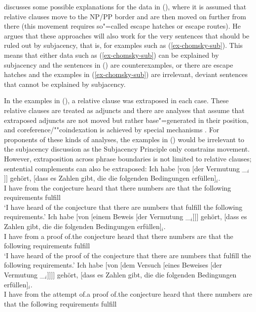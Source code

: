 \citet[--54]{Koster78b-u} discusses some possible explanations for the data in (), where it is assumed that relative clauses move to the NP/PP border and are then
moved on further from there (this movement requires so"=called escape hatches or escape routes). He argues that
these approaches will also work for the very sentences that should be ruled out by subjacency, that is, for examples such as (\ref{ex-chomsky-sub}). This means that either
data such as (\ref{ex-chomsky-sub}) can be explained by subjacency and the sentences in ()  are counterexamples, or there are escape hatches and the examples in
(\ref{ex-chomsky-sub}) are irrelevant, deviant sentences that cannot be explained by subjacency.

In the examples in (), a relative clause was extraposed in each case. These relative clauses
are treated as adjuncts and there are analyses that assume that extraposed adjuncts are not moved but rather base"=generated in their position,
and coreference/""coindexation is achieved by special mechanisms \citep{Kiss2005a}.
For proponents of these kinds of analyses, the examples in () would be irrelevant to the subjacency discussion as the Subjacency Principle
only constrains movement. However, extraposition across phrase boundaries is not limited to relative clauses; sentential complements can also be extraposed:
\eal
\ex 
\gll Ich habe [von [der Vermutung \_$_i$]] gehört, [dass es Zahlen gibt, die die folgenden Bedingungen erfüllen]$_i$.\\
	 I have \spacebr{}from \spacebr{}the conjecture {} heard \spacebr{}that there numbers are that the following requirements fulfill\\
\glt `I have heard of the conjecture that there are numbers that fulfill the following requirements.'
\ex 
\gll Ich habe [von [einem Beweis [der Vermutung \_$_i$]]] gehört, [dass es Zahlen gibt, die die folgenden Bedingungen erfüllen]$_i$.\\
	I have \spacebr{}from \spacebr{}a proof \spacebr{}of.the conjecture {} heard \spacebr{}that there numbers are that the following requirements fulfill\\
\glt `I have heard of the proof of the conjecture that there are numbers that fulfill the following requirements.'
\ex 
\gll Ich habe [von [dem Versuch [eines Beweises [der Vermutung \_$_i$]]]] gehört, [dass es Zahlen gibt, die die folgenden Bedingungen erfüllen]$_i$.\\
	I have \spacebr{}from \spacebr{}the attempt \spacebr{}of.a proof \spacebr{}of.the conjecture {} heard \spacebr{}that there numbers are that the following requirements fulfill\\
